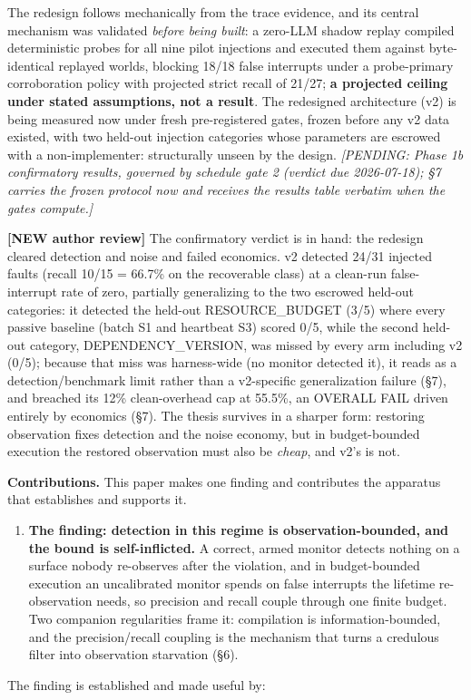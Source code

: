 \documentclass[acmsmall,screen,review,anonymous]{acmart}
\renewenvironment{leftbar}{%
  \def\FrameCommand{\hspace{2pt}{\color{lbcol}\vrule width 1.5pt}\hspace{8pt}}%
  \MakeFramed{\advance\hsize-\width \FrameRestore}\small}%
  {\endMakeFramed}
\begin{document}
The redesign follows mechanically from the trace evidence, and its central mechanism was validated \emph{before being built}: a zero-LLM shadow replay compiled deterministic probes for all nine pilot injections and executed them against byte-identical replayed worlds, blocking 18/18 false interrupts under a probe-primary corroboration policy with projected strict recall of 21/27; \textbf{a projected ceiling under stated assumptions, not a result}. The redesigned architecture (v2) is being measured now under fresh pre-registered gates, frozen before any v2 data existed, with two held-out injection categories whose parameters are escrowed with a non-implementer: structurally unseen by the design. \emph{[PENDING: Phase 1b confirmatory results, governed by schedule gate 2 (verdict due 2026-07-18); \S7 carries the frozen protocol now and receives the results table verbatim when the gates compute.]}

\begin{leftbar}
\textbf{[NEW \textperiodcentered{} author review]} The confirmatory verdict is in hand: the redesign cleared detection and noise and failed economics. v2 detected 24/31 injected faults (recall 10/15 = 66.7\% on the recoverable class) at a clean-run false-interrupt rate of zero, partially generalizing to the two escrowed held-out categories: it detected the held-out RESOURCE\_BUDGET (3/5) where every passive baseline (batch S1 and heartbeat S3) scored 0/5, while the second held-out category, DEPENDENCY\_VERSION, was missed by every arm including v2 (0/5); because that miss was harness-wide (no monitor detected it), it reads as a detection/benchmark limit rather than a v2-specific generalization failure (\S7), and breached its 12\% clean-overhead cap at 55.5\%, an OVERALL FAIL driven entirely by economics (\S7). The thesis survives in a sharper form: restoring observation fixes detection and the noise economy, but in budget-bounded execution the restored observation must also be \emph{cheap}, and v2's is not.

\end{leftbar}
\textbf{Contributions.} This paper makes one finding and contributes the apparatus that establishes and supports it.

\begin{enumerate}
  \item \textbf{The finding: detection in this regime is observation-bounded, and the bound is self-inflicted.} A correct, armed monitor detects nothing on a surface nobody re-observes after the violation, and in budget-bounded execution an uncalibrated monitor spends on false interrupts the lifetime re-observation needs, so precision and recall couple through one finite budget. Two companion regularities frame it: compilation is information-bounded, and the precision/recall coupling is the mechanism that turns a credulous filter into observation starvation (\S6).
\end{enumerate}
The finding is established and made useful by:
\end{document}

